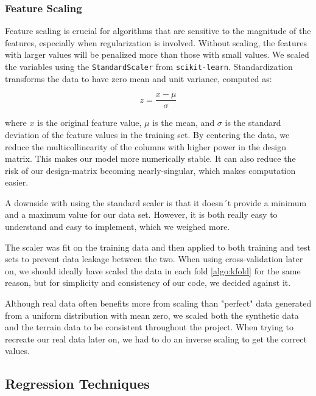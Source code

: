 \subsubsection{Feature Scaling}

Feature scaling is crucial for algorithms that are sensitive to the magnitude of the features, especially when regularization is involved. Without scaling, the features with larger values will be penalized more than those with small values. We scaled the variables using the \texttt{StandardScaler} from \texttt{scikit-learn}. Standardization transforms the data to have zero mean and unit variance, computed as:

\begin{equation}
    z = \frac{x - \mu}{\sigma}
\end{equation}

where $x$ is the original feature value, $\mu$ is the mean, and $\sigma$ is the standard deviation of the feature values in the training set. By centering the data, we reduce the multicollinearity of the columns with higher power in the design matrix. This makes our model more numerically stable. It can also reduce the risk of our design-matrix becoming nearly-singular, which makes computation easier.\cite{polyreg_budescu}

A downside with using the standard scaler is that it doesn´t provide a minimum and a maximum value for our data set. \cite{Hjorth-Jensen_MachineLearning_2023} However, it is both really easy to understand and easy to implement, which we weighed more.

The scaler was fit on the training data and then applied to both training and test sets to prevent data leakage between the two. When using cross-validation later on, we should ideally have scaled the data in each fold \ref{algo:kfold} for the same reason, but for simplicity and consistency of our code, we decided against it. 

 Although real data often benefits more from scaling than "perfect" data generated from a uniform distribution with mean zero, we scaled both the synthetic data and the terrain data to be consistent throughout the project. When trying to recreate our real data later on, we had to do an inverse scaling to get the correct values. 


\subsection{Regression Techniques}

